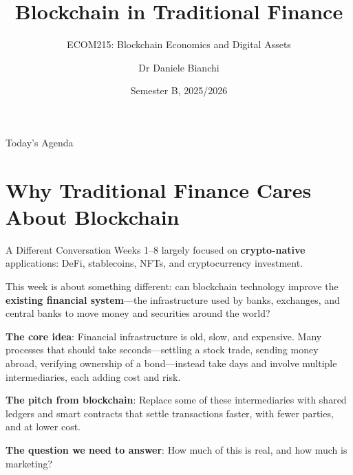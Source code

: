 \documentclass[10pt]{beamer}
\title{Blockchain in Traditional Finance}
\subtitle{ECOM215: Blockchain Economics and Digital Assets}
\author{Dr Daniele Bianchi}
\institute{Queen Mary, University of London}
\date{Semester B, 2025/2026}
\newcommand{\highlight}[1]{\textcolor{AccentOrange}{\textbf{#1}}}
\begin{document}
\AtBeginSection[]{
  \begin{frame}[plain]
    \vfill
    \begin{center}
      {\Large\color{ImperialBlue}\insertsection}
    \end{center}
    \vfill
  \end{frame}
}

\begin{frame}[plain]
  \titlepage
\end{frame}

\begin{frame}{Today's Agenda}
  \tableofcontents
\end{frame}

\section{Why Traditional Finance Cares About Blockchain}

\begin{frame}{A Different Conversation}
  Weeks 1--8 largely focused on \highlight{crypto-native} applications: DeFi, stablecoins, NFTs, and cryptocurrency investment.
  
 \vspace{1em}
   This week is about something different: can blockchain technology improve the \highlight{existing financial system}---the infrastructure used by banks, exchanges, and central banks to move money and securities around the world?
  
  \vspace{1em}
  \textbf{The core idea}: Financial infrastructure is old, slow, and expensive. Many processes that should take seconds---settling a stock trade, sending money abroad, verifying ownership of a bond---instead take days and involve multiple intermediaries, each adding cost and risk.
  
  \vspace{1em}
  \textbf{The pitch from blockchain}: Replace some of these intermediaries with shared ledgers and smart contracts that settle transactions faster, with fewer parties, and at lower cost.
  
  \vspace{1em}
  \highlight{The question we need to answer}: How much of this is real, and how much is marketing?
\end{frame}
\end{document}
